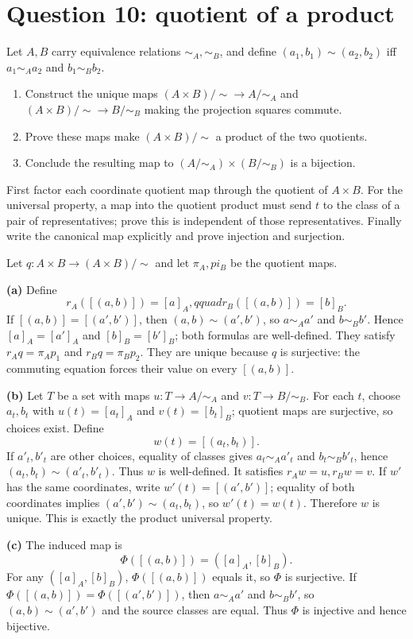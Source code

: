 \documentclass[11pt,openany]{book}
\begin{document}
\section{Question 10: quotient of a product}
\begin{questionbox}
Let $A,B$ carry equivalence relations $\sim_A,\sim_B$, and define
$(a_1,b_1)\sim(a_2,b_2)$ iff $a_1\sim_Aa_2$ and $b_1\sim_Bb_2$.
\begin{enumerate}[label=(\alph*)]
\item Construct the unique maps $(A\times B)/\sim\to A/\sim_A$ and $(A\times B)/\sim\to B/\sim_B$ making the projection squares commute.
\item Prove these maps make $(A\times B)/\sim$ a product of the two quotients.
\item Conclude the resulting map to $(A/\sim_A)\times(B/\sim_B)$ is a bijection.
\end{enumerate}
\end{questionbox}
\begin{approachbox}
First factor each coordinate quotient map through the quotient of $A\times B$. For the universal property, a map into the quotient product must send $t$ to the class of a pair of representatives; prove this is independent of those representatives. Finally write the canonical map explicitly and prove injection and surjection.
\end{approachbox}
\begin{solutionbox}
Let $q:A\times B\to(A\times B)/\sim$ and let $\pi_A,pi_B$ be the quotient maps.

\textbf{(a)} Define
\[
r_A([(a,b)])=[a]_A,qquad r_B([(a,b)])=[b]_B.
\]
If $[(a,b)]=[(a',b')]$, then $(a,b)\sim(a',b')$, so $a\sim_Aa'$ and $b\sim_Bb'$. Hence $[a]_A=[a']_A$ and $[b]_B=[b']_B$; both formulas are well-defined. They satisfy
$r_Aq=\pi_Ap_1$ and $r_Bq=\pi_Bp_2$. They are unique because $q$ is surjective: the commuting equation forces their value on every $[(a,b)]$.

\textbf{(b)} Let $T$ be a set with maps $u:T\to A/\sim_A$ and $v:T\to B/\sim_B$. For each $t$, choose $a_t,b_t$ with $u(t)=[a_t]_A$ and $v(t)=[b_t]_B$; quotient maps are surjective, so choices exist. Define
\[
w(t)=[(a_t,b_t)].
\]
If $a'_t,b'_t$ are other choices, equality of classes gives $a_t\sim_Aa'_t$ and $b_t\sim_Bb'_t$, hence $(a_t,b_t)\sim(a'_t,b'_t)$. Thus $w$ is well-defined. It satisfies $r_Aw=u,r_Bw=v$. If $w'$ has the same coordinates, write $w'(t)=[(a',b')]$; equality of both coordinates implies $(a',b')\sim(a_t,b_t)$, so $w'(t)=w(t)$. Therefore $w$ is unique. This is exactly the product universal property.

\textbf{(c)} The induced map is
\[
\Phi([(a,b)])=([a]_A,[b]_B).
\]
For any $([a]_A,[b]_B)$, $\Phi([(a,b)])$ equals it, so $\Phi$ is surjective. If
$\Phi([(a,b)])=\Phi([(a',b')])$, then $a\sim_Aa'$ and $b\sim_Bb'$, so $(a,b)\sim(a',b')$ and the source classes are equal. Thus $\Phi$ is injective and hence bijective.
\end{solutionbox}
\end{document}
